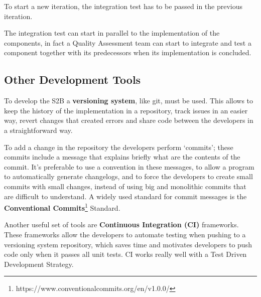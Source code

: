 To start a new iteration, the integration test has to be passed in the previous iteration.

The integration test can start in parallel to the implementation of the components, in fact a Quality Assessment team can start to integrate and test a component together with its predecessors when its implementation is concluded.

\subsection{Other Development Tools}
To develop the S2B a \textbf{versioning system}, like git, must be used. This allows to keep the history of the implementation in a repository, track issues in an easier way, revert changes that created errors and share code between the developers in a straightforward way.

To add a change in the repository the developers perform `commits'; these commits include a message that explains briefly what are the contents of the commit. It's preferable to use a convention in these messages, to allow a program to automatically generate changelogs, and to force the developers to create small commits with small changes, instead of using big and monolithic commits that are difficult to understand. A widely used standard for commit messages is the \textbf{Conventional Commits}\footnote{https://www.conventionalcommits.org/en/v1.0.0/} Standard.

Another useful set of tools are \textbf{Continuous Integration (CI)} frameworks. These frameworks allow the developers to automate testing when pushing to a versioning system repository, which saves time and motivates developers to push code only when it passes all unit tests. CI works really well with a Test Driven Development Strategy.